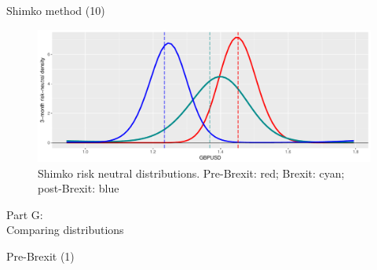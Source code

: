 \begin{frame}{Shimko method (10)}

\begin{figure}
\includegraphics[width=1\linewidth]{2018_02_07_IMF_FXCourse_files/figure-beamer/unnamed-chunk-76-1} \caption{Shimko risk neutral distributions. Pre-Brexit: red; Brexit: cyan; post-Brexit: blue}\label{fig:unnamed-chunk-76}
\end{figure}

\end{frame}

\begin{frame}{}

\color{blue} \LARGE{Part G:}\\
\LARGE{Comparing distributions}

\end{frame}

\begin{frame}[fragile]{Pre-Brexit (1)}

\begin{Shaded}
\begin{Highlighting}[]
\NormalTok{(}\NormalTok{(}\OperatorTok{+}\StringTok{ }
\StringTok{  }\NormalTok{(}\NormalTok{(}\NormalTok{, }\NormalTok{) }\OperatorTok{+}
\StringTok{  }\NormalTok{(}\NormalTok{(}
            \NormalTok{, }\NormalTok{) }\OperatorTok{+}
\StringTok{  }\NormalTok{(}\NormalTok{(}
            \NormalTok{, }\NormalTok{) }\OperatorTok{+}
\StringTok{  }\NormalTok{(}\NormalTok{, }\NormalTok{, }\NormalTok{) }\OperatorTok{+}
\StringTok{  }\NormalTok{(}\NormalTok{, }\NormalTok{)   }
\end{Highlighting}
\end{Shaded}

\end{frame}

